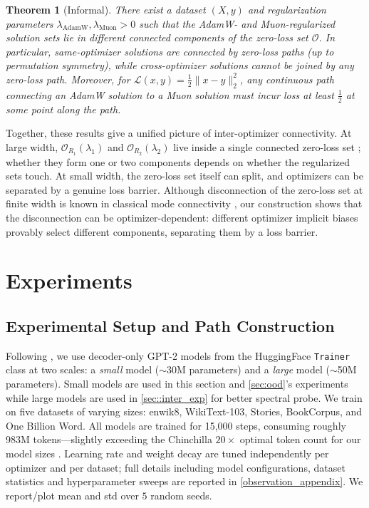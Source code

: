 \documentclass{article}
\newtheorem{theorem}{Theorem}[section]
\begin{document}
\begin{theorem}[Informal]
\label{t1:Finitewidth_construction}
There exist a dataset $(X,y)$ and regularization parameters $\lambda_{\mathrm{AdamW}}, \lambda_{\mathrm{Muon}} > 0$ such that the AdamW- and Muon-regularized solution sets lie in different connected components of the zero-loss set $\mathcal{O}$. In particular, same-optimizer solutions are connected by zero-loss paths (up to permutation symmetry), while cross-optimizer solutions cannot be joined by any zero-loss path. Moreover, for $\mathcal{L}(x,y) = \tfrac{1}{2}\|x-y\|_2^2$, any continuous path connecting an AdamW solution to a Muon solution must incur loss at least $\tfrac{1}{2}$ at some point along the path.
\end{theorem}

Together, these results give a unified picture of inter-optimizer connectivity. At large width, $\mathcal{O}_{R_1}(\lambda_1)$ and $\mathcal{O}_{R_2}(\lambda_2)$ live inside a single connected zero-loss set \citep{nguyen2021note}; whether they form one or two components depends on whether the regularized sets touch. At small width, the zero-loss set itself can split, and optimizers can be separated by a genuine loss barrier. Although disconnection of the zero-loss set at finite width is known in classical mode connectivity \citep{freeman2017topologygeometryhalfrectifiednetwork,venturi2019spurious,kuditipudi2020explaininglandscapeconnectivitylowcost, nguyen2021note}, our construction shows that the disconnection can be optimizer-dependent: different optimizer implicit biases provably select different components, separating them by a loss barrier.

\section{Experiments}
\label{sec:experiments}
\subsection{Experimental Setup and Path Construction}
\label{sec:setup}
Following \citep{theus2025generalizedlinearmodeconnectivity}, we use decoder-only GPT-2 models from the HuggingFace \texttt{Trainer} class at two scales: a \emph{small} model ($\sim$30M parameters) and a \emph{large} model ($\sim$50M parameters). Small models are used in this section and \cref{sec:ood}'s experiments while large models are used in \cref{sec::inter_exp} for better spectral probe. We train on five datasets of varying sizes: enwik8, WikiText-103, Stories, BookCorpus, and One Billion Word. All models are trained for 15{,}000 steps, consuming roughly 983M tokens---slightly exceeding the Chinchilla $20\times$ optimal token count for our model sizes \citep{hoffmann2022trainingcomputeoptimallargelanguage}. Learning rate and weight decay are tuned independently per optimizer and per dataset; full details including model configurations, dataset statistics and hyperparameter sweeps are reported in \cref{observation_appendix}. We report/plot mean and std over $5$ random seeds.
\end{document}
